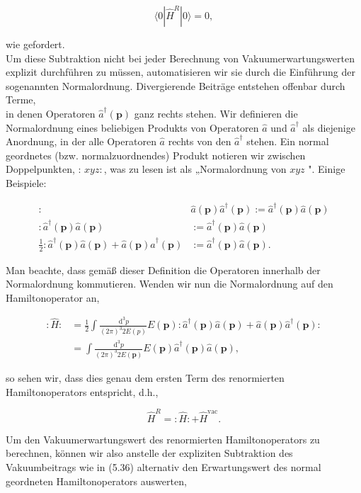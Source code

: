 \documentclass[10pt, letterpaper]{article}
\begin{document}
$$
\langle 0| \hat{H}^{R}|0\rangle=0,
$$

wie gefordert.\\
Um diese Subtraktion nicht bei jeder Berechnung von Vakuumerwartungswerten explizit durchführen zu müssen, automatisieren wir sie durch die Einführung der sogenannten Normalordnung. Divergierende Beiträge entstehen offenbar durch Terme,\\
in denen Operatoren $\hat{a}^{\dagger}(\mathbf{p})$ ganz rechts stehen. Wir definieren die Normalordnung eines beliebigen Produkts von Operatoren $\hat{a}$ und $\hat{a}^{\dagger}$ als diejenige Anordnung, in der alle Operatoren $\hat{a}$ rechts von den $\hat{a}^{\dagger}$ stehen. Ein normal geordnetes (bzw. normalzuordnendes) Produkt notieren wir zwischen Doppelpunkten, : $x y z:$, was zu lesen ist als „Normalordnung von $x y z$ ". Einige Beispiele:

$$
\begin{aligned}
: & \hat{a}(\mathbf{p}) \hat{a}^{\dagger}(\mathbf{p}):=\hat{a}^{\dagger}(\mathbf{p}) \hat{a}(\mathbf{p}) \\
: \hat{a}^{\dagger}(\mathbf{p}) \hat{a}(\mathbf{p}) & :=\hat{a}^{\dagger}(\mathbf{p}) \hat{a}(\mathbf{p}) \\
\frac{1}{2}: \hat{a}^{\dagger}(\mathbf{p}) \hat{a}(\mathbf{p})+\hat{a}(\mathbf{p}) \hat{a}^{\dagger}(\mathbf{p}) & :=\hat{a}^{\dagger}(\mathbf{p}) \hat{a}(\mathbf{p}) .
\end{aligned}
$$

Man beachte, dass gemäß dieser Definition die Operatoren innerhalb der Normalordnung kommutieren. Wenden wir nun die Normalordnung auf den Hamiltonoperator an,

$$
\begin{aligned}
: \hat{H}: & =\frac{1}{2} \int \frac{\mathrm{~d}^{3} p}{(2 \pi)^{3} 2 E(p)} E(\mathbf{p}): \hat{a}^{\dagger}(\mathbf{p}) \hat{a}(\mathbf{p})+\hat{a}(\mathbf{p}) \hat{a}^{\dagger}(\mathbf{p}): \\
& =\int \frac{\mathrm{d}^{3} p}{(2 \pi)^{3} 2 E(\mathbf{p})} E(\mathbf{p}) \hat{a}^{\dagger}(\mathbf{p}) \hat{a}(\mathbf{p}),
\end{aligned}
$$

so sehen wir, dass dies genau dem ersten Term des renormierten Hamiltonoperators entspricht, d.h.,

$$
\hat{H}^{R}=: \hat{H}:+\hat{H}^{\mathrm{vac}} .
$$

Um den Vakuumerwartungswert des renormierten Hamiltonoperators zu berechnen, können wir also anstelle der expliziten Subtraktion des Vakuumbeitrags wie in (5.36) alternativ den Erwartungswert des normal geordneten Hamiltonoperators auswerten,
\end{document}
